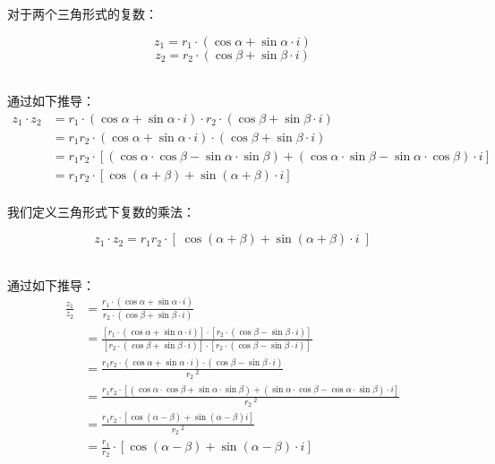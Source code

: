 \documentclass[UTF8]{ctexart}
\begin{document}
    对于两个三角形式的复数：
    \begin{large}
        \begin{equation*}
            z_1=r_1\cdot(\cos{\alpha}+\sin{\alpha}\cdot i)
        \end{equation*}
        \begin{equation*}
            z_2=r_2\cdot(\cos{\beta}+\sin{\beta}\cdot i)
        \end{equation*}
    \end{large}\\
    通过如下推导：
    \setcounter{equation}{0}
    \begin{align}
        z_1\cdot z_2
        &=r_1\cdot(\cos{\alpha}+\sin{\alpha}\cdot i)\cdot r_2\cdot(\cos{\beta}+\sin{\beta}\cdot i)\\[2mm]
        &=r_1r_2\cdot(\cos{\alpha}+\sin{\alpha}\cdot i)\cdot(\cos{\beta}+\sin{\beta}\cdot i)\\[2mm]
        &=r_1r_2\cdot\left[(\cos{\alpha}\cdot\cos{\beta}-\sin{\alpha}\cdot\sin{\beta})+(\cos{\alpha}\cdot\sin{\beta}-\sin{\alpha}\cdot\cos{\beta})\cdot i\right]\\[2mm]
        &=r_1r_2\cdot\left[\cos{(\alpha+\beta)}+\sin{(\alpha+\beta)}\cdot i\right]
    \end{align}\\
    我们定义三角形式下复数的乘法：
    \begin{large}
        \begin{equation*}
            z_1\cdot z_2=r_1r_2\cdot\left[\;\cos{(\alpha+\beta)}+\sin{(\alpha+\beta)}\cdot i\;\right]
        \end{equation*}
    \end{large}\\
    通过如下推导：
    \setcounter{equation}{0}
    \begin{align}
        \frac{z_1}{z_2}
        &=\frac{r_1\cdot(\cos{\alpha}+\sin{\alpha}\cdot i)}{r_2\cdot(\cos{\beta}+\sin{\beta}\cdot i)}\\[3mm]
        &=\frac{[r_1\cdot(\cos{\alpha}+\sin{\alpha}\cdot i)]\cdot[r_2\cdot(\cos{\beta}-\sin{\beta}\cdot i)]}{[r_2\cdot(\cos{\beta}+\sin{\beta}\cdot i)]\cdot[r_2\cdot(\cos{\beta}-\sin{\beta}\cdot i)]}\\[3mm]
        &=\frac{r_1r_2\cdot(\cos{\alpha}+\sin{\alpha}\cdot i)\cdot(\cos{\beta}-\sin{\beta}\cdot i)}{r_2~^2}\\[3mm]
        &=\frac{r_1r_2\cdot\left[(\cos{\alpha}\cdot\cos{\beta}+\sin{\alpha}\cdot\sin{\beta})+(\sin{\alpha}\cdot\cos{\beta}-\cos{\alpha}\cdot\sin{\beta})\cdot i\right]}{r_2~^2}\\[3mm]
        &=\frac{r_1r_2\cdot\left[\cos{(\alpha-\beta)}+\sin{(\alpha-\beta)}i\right]}{r_2~^2}\\[3mm]
        &=\frac{r_1}{r_2}\cdot\left[\cos{(\alpha-\beta)}+\sin{(\alpha-\beta)}\cdot i\right]
    \end{align}\\
\end{document}
